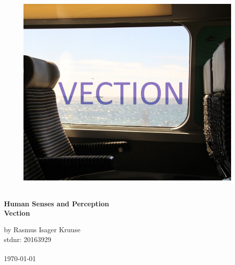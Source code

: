 \begin{titlepage}
			
\addtolength{\voffset}{2cm}

\begin{figure}[H]
\centering
\vspace{2cm}	%
\includegraphics[width=0.99\linewidth]{figure/Frontpage/poster.png}
\end{figure}

\mbox{}
\vfill
\renewcommand{\familydefault}{\sfdefault} \normalfont %
\HRule\\[0.1cm]
\textbf{{\small Human Senses and Perception\\ {\Huge Vection}}} \hspace{0.15cm}\\
\HRule\smallskip{}

\Large by \LARGE Rasmus Isager Kruuse\\
\Large stdnr: 20163929\\\\


\today
\renewcommand{\familydefault}{\rmdefault} \normalfont %
\end{titlepage}


